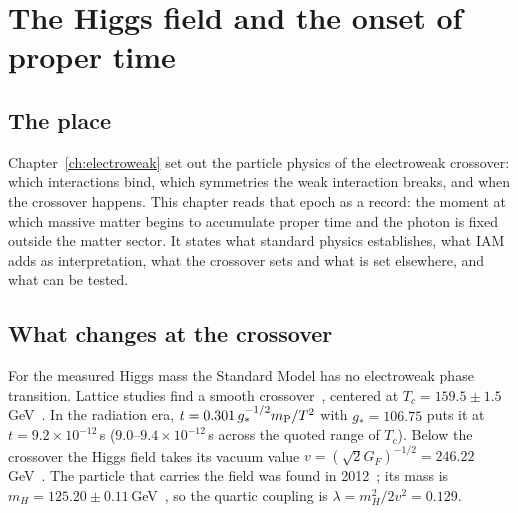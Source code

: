 \chapter{The Higgs field and the onset of proper time}\label{ch:higgsrecord}

\section*{The place}
Chapter~\ref{ch:electroweak} set out the particle physics of the electroweak crossover: which interactions bind, which symmetries the weak
interaction breaks, and when the crossover happens. This chapter reads that epoch as a record: the moment at which massive matter begins to accumulate proper time and the photon is fixed outside the
matter sector. It states what standard physics establishes, what IAM adds as interpretation, what the crossover sets and what is set elsewhere,
and what can be tested.

\section{What changes at the crossover}\label{sec:hr:change}
For the measured Higgs mass the Standard Model has no electroweak phase transition. Lattice studies find a smooth crossover~\cite{Kajantie1996},
centered at $T_c=159.5\pm1.5$\,GeV~\cite{DOnofrio2016}. \observed{} In the radiation era, $t=0.301\,g_*^{-1/2}m_{\mathrm P}/T^2$ with $g_*=106.75$ puts it at
$t=9.2\times10^{-12}$\,s ($9.0$--$9.4\times10^{-12}$\,s across the quoted range of $T_c$). \calc{} Below the crossover the Higgs field takes its vacuum
value $v=(\sqrt2G_F)^{-1/2}=246.22$\,GeV~\cite{Englert1964,Higgs1964}. The particle that carries the field was found in 2012~\cite{ATLAS2012Higgs,CMS2012Higgs};
its mass is $m_H=125.20\pm0.11$\,GeV~\cite{PDG2024}, so the quartic coupling is $\lambda=m_H^2/2v^2=0.129$. \calc

